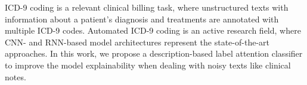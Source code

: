 ICD-9 coding is a relevant clinical billing task, where unstructured texts with information about a patient's diagnosis and treatments are annotated with multiple ICD-9 codes. Automated ICD-9 coding is an active research field, where CNN- and RNN-based model architectures represent the state-of-the-art approaches. In this work, we propose a description-based label attention classifier to improve the model explainability when dealing with noisy texts like clinical notes.
